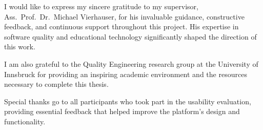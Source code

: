 I would like to express my sincere gratitude to my supervisor, Ass.\ Prof.\ Dr.\ Michael Vierhauser,
for his invaluable guidance, constructive feedback, and continuous support throughout this project.
His expertise in software quality and educational technology significantly shaped the direction of this work.

I am also grateful to the Quality Engineering research group at the University of Innsbruck for
providing an inspiring academic environment and the resources necessary to complete this thesis.

Special thanks go to all participants who took part in the usability evaluation, providing essential
feedback that helped improve the platform's design and functionality.
